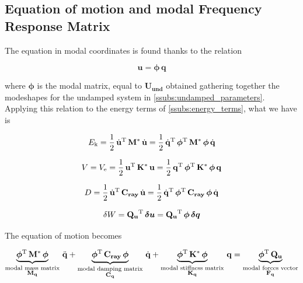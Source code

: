 \documentclass[a4paper,12pt,oneside]{article}
\begin{document}
\vspace{20pt}

\subsection{Equation of motion and modal Frequency Response Matrix}

The equation in modal coordinates is found thanks to the relation

\[ \mathbf{u} = \bm{\phi} \, \mathbf{q} \]

\vspace{10pt}

where $ \bm{\phi} $ is the modal matrix, equal to $ \mathbf{U_{und}} $ obtained gathering together the modeshapes for the undamped system in \ref{ssubs:undamped_parameters}. Applying this relation to the energy terms of \ref{ssubs:energy_terms}, what we have is

\[
	E_\textup{k} =
		\frac{1}{2} \, \dot{\mathbf{u}}^\textup{T} \, \mathbf{M^*} \, \dot{\mathbf{u}} =
		\frac{1}{2} \, \dot{\mathbf{q}}^\textup{T} \,	\bm{\phi}^\textup{T} \,
		\mathbf{M^*} \, \bm{\phi} \, \dot{\mathbf{q}}
\]

\[
	V = V_\textup{e} =
		\frac{1}{2} \, \mathbf{u}^\textup{T} \, \mathbf{K^*} \, \mathbf{u} =
		\frac{1}{2} \, \mathbf{q}^\textup{T} \,	\bm{\phi}^\textup{T} \,
		\mathbf{K^*} \, \bm{\phi} \, \mathbf{q}
\]

\[
	D = \frac{1}{2} \, \dot{\mathbf{u}}^\textup{T} \,	\mathbf{C_{ray}} \,
		\dot{\mathbf{u}} =
		\frac{1}{2} \, \dot{\mathbf{q}}^\textup{T} \,	\bm{\phi}^\textup{T} \,
		\mathbf{C_{ray}} \, \bm{\phi} \, \dot{\mathbf{q}}
\]

\[
	\delta W = \mathbf{Q_u}^\textup{T} \, \bm{\delta u} =
		\mathbf{Q_u}^\textup{T} \, \bm{\phi} \, \bm{\delta q}
\]

The equation of motion becomes

\[
	\underbrace{\bm{\phi}^\textup{T} \, \mathbf{M^*} \, \bm{\phi}}_
		{\substack{\text{modal mass matrix} \\
		\text{$ \mathbf{M_q} $}}} \, \ddot{\mathbf{q}} +
		\underbrace{\bm{\phi}^\textup{T} \, \mathbf{C_{ray}} \,	\bm{\phi}}_
		{\substack{\text{modal damping matrix} \\
		\text{$ \mathbf{C_q} $}}} \, \dot{\mathbf{q}} +
		\underbrace{\bm{\phi}^\textup{T} \, \mathbf{K^*} \, \bm{\phi}}_
		{\substack{\text{modal stiffness matrix} \\
		\text{$ \mathbf{K_q} $}}} \, \mathbf{q} =
		\underbrace{\bm{\phi}^\textup{T} \, \mathbf{Q_u}}_
		{\substack{\text{modal forces vector} \\
		\text{$ \mathbf{F_q} $}}}
\]
\end{document}
